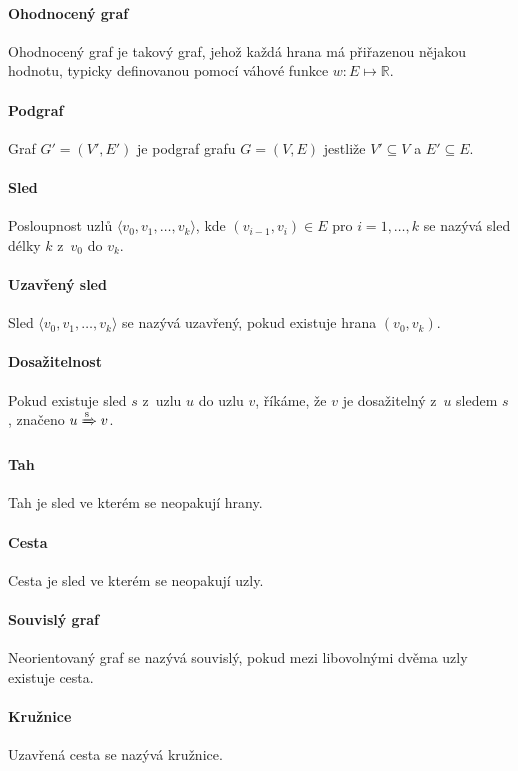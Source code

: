 \paragraph*{Ohodnocený graf} Ohodnocený graf je takový graf, jehož každá hrana má přiřazenou nějakou hodnotu, typicky definovanou pomocí váhové funkce $w : E \mapsto \mathbb{R}$.

\paragraph*{Podgraf} Graf $G' = (V', E')$ je podgraf grafu $G = (V, E)$ jestliže $V' \subseteq V$ a $E' \subseteq E$.

\paragraph*{Sled} Posloupnost uzlů $\langle v_0, v_1, \dots, v_k \rangle$, kde $(v_{i-1}, v_i) \in E$ pro $i = 1, \dots, k$ se nazývá sled délky $k$ z~$v_0$ do $v_k$.

\paragraph*{Uzavřený sled} Sled $\langle v_0, v_1, \dots, v_k \rangle$ se nazývá uzavřený, pokud existuje hrana $(v_0, v_k)$.

\paragraph*{Dosažitelnost} Pokud existuje sled $s$ z~uzlu $u$ do uzlu $v$, říkáme, že $v$ je dosažitelný z~$u$ sledem $s$, značeno $u \xRightarrow{\text{s}} v$.

\paragraph*{Tah} Tah je sled ve kterém se neopakují hrany.

\paragraph*{Cesta} Cesta je sled ve kterém se neopakují uzly.

\paragraph*{Souvislý graf} Neorientovaný graf se nazývá souvislý, pokud mezi libovolnými dvěma uzly existuje cesta.

\paragraph*{Kružnice} Uzavřená cesta se nazývá kružnice.

